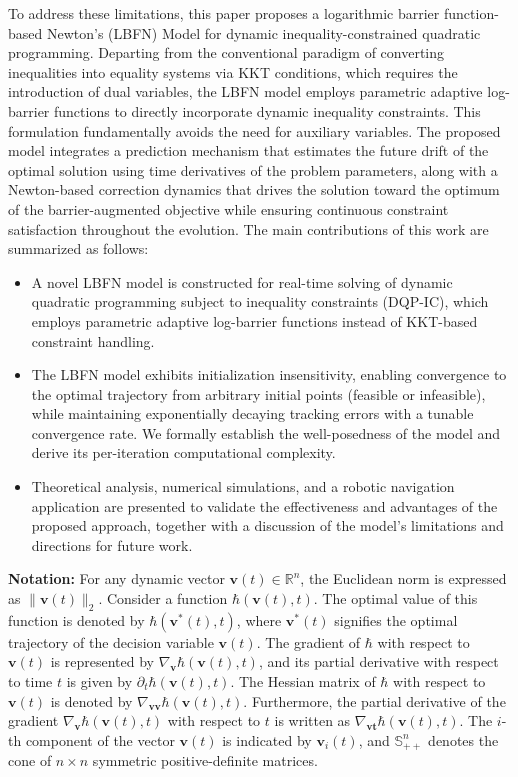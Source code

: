 \documentclass[fleqn,10pt]{wlscirep}
\begin{document}
To address these limitations, this paper proposes a logarithmic barrier function-based Newton's (LBFN) Model for dynamic inequality-constrained quadratic programming. Departing from the conventional paradigm of converting inequalities into equality systems via KKT conditions, which requires the introduction of dual variables, the LBFN model employs parametric adaptive log-barrier functions to directly incorporate dynamic inequality constraints. This formulation fundamentally avoids the need for auxiliary variables. The proposed model integrates a prediction mechanism that estimates the future drift of the optimal solution using time derivatives of the problem parameters, along with a Newton-based correction dynamics that drives the solution toward the optimum of the barrier-augmented objective while ensuring continuous constraint satisfaction throughout the evolution. The main contributions of this work are summarized as follows:

\begin{itemize}
\item A novel LBFN model is constructed for real-time solving of dynamic quadratic programming subject to inequality constraints (DQP-IC), which employs parametric adaptive log-barrier functions instead of KKT-based constraint handling.

\item The LBFN model exhibits initialization insensitivity, enabling convergence to the optimal trajectory from arbitrary initial points (feasible or infeasible), while maintaining exponentially decaying tracking errors with a tunable convergence rate. We formally establish the well-posedness of the model and derive its per-iteration computational complexity.

\item Theoretical analysis, numerical simulations, and a robotic navigation application are presented to validate the effectiveness and advantages of the proposed approach, together with a discussion of the model's limitations and directions for future work.
\end{itemize}

\textbf{Notation:} For any dynamic vector $\bm{v}(t) \in \mathbb{R}^{n}$, the Euclidean norm is expressed as $\|\bm{v}(t)\|_{2}$. Consider a function $\hbar(\bm{v}(t), t)$. The optimal value of this function is denoted by $\hbar(\bm{v}^{*}(t),t)$, where $\bm{v}^{*}(t)$ signifies the optimal trajectory of the decision variable $\bm{v}(t)$. The gradient of $\hbar$ with respect to $\bm{v}(t)$ is represented by $\nabla_{\bm{v}}\hbar(\bm{v}(t), t)$, and its partial derivative with respect to time $t$ is given by $\partial_{t}\hbar(\bm{v}(t), t)$. The Hessian matrix of $\hbar$ with respect to $\bm{v}(t)$ is denoted by $\nabla_{\bm{vv}}\hbar(\bm{v}(t), t)$. Furthermore, the partial derivative of the gradient $\nabla_{\bm{v}}\hbar(\bm{v}(t), t)$ with respect to $t$ is written as $\nabla_{\bm{vt}}\hbar(\bm{v}(t), t)$. The $i$-th component of the vector $\bm{v}(t)$ is indicated by $\bm{v}_{i}(t)$, and $\mathbb{S}^n_{++}$ denotes the cone of $n\times n$ symmetric positive-definite matrices.
\end{document}

